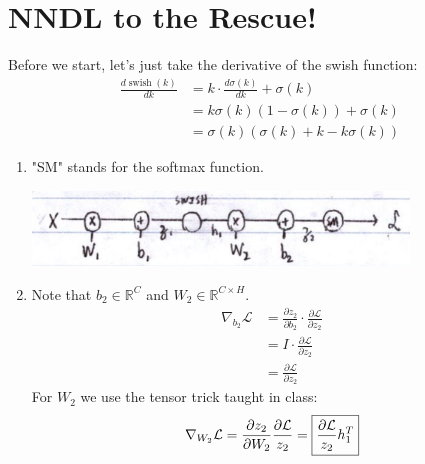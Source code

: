 \documentclass[12pt]{article}
\DeclareMathOperator{\swish}{swish}
\newcommand{\loss}{\mathcal{L}}
\newcommand{\real}{\mathbb{R}}
\begin{document}
\pagebreak

\section{NNDL to the Rescue!}

Before we start, let's just take the derivative of the swish function:
\begin{align*}
    \frac{d \swish(k)}{dk}
     & = k \cdot \frac{d \sigma(k)}{dk} + \sigma(k) \\
     & = k\sigma(k)(1-\sigma(k))+\sigma(k)          \\
     & = \sigma(k)(\sigma(k)+k-k\sigma(k))
\end{align*}

\begin{enumerate}[label=(\alph*)]
    \item "SM" stands for the softmax function.
          \begin{center}
              \includegraphics[width=10cm]{img/hw3/swish}
          \end{center}

    \item Note that $b_2 \in \real^C$ and $W_2 \in \real^{C \times H}$.
          \begin{align*}
              \nabla_{b_2} \loss
               & = \frac{\partial z_2}{\partial b_2} \cdot \frac{\partial \loss}{\partial z_2} \\
               & = I \cdot \frac{\partial \loss}{\partial z_2}                                 \\
               & = \boxed{\frac{\partial \loss}{\partial z_2}}
          \end{align*}
          For $W_2$ we use the tensor trick taught in class:
          \[\nabla_{W_2} \loss
              = \frac{\partial z_2}{\partial W_2} \frac{\partial \loss}{z_2} \\
              = \boxed{\frac{\partial \loss}{z_2} h_1^T}\]


\end{enumerate}
\end{document}
